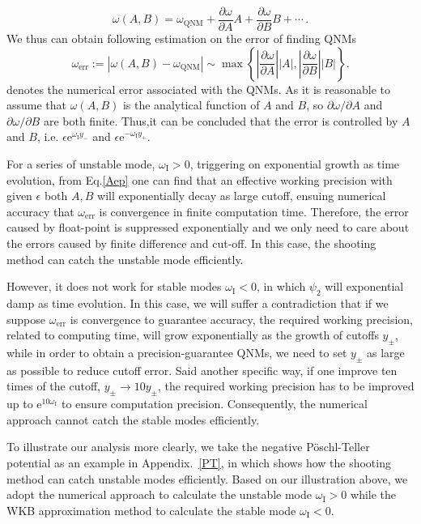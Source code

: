 \documentclass[pr, twocolumn, preprintnumbers, showpacs,footnoteadded, superscriptaddress,nofootinbib,longbibliography]{revtex4-1}
\newcommand{\te}{\mathrm{e}}
\begin{document}
%
\begin{equation}
\omega(A,B)= \omega_{\text{QNM}} +\frac{\partial\omega}{\partial A} A + \frac{\partial \omega}{\partial B} B + \cdots\,.
\end{equation}
%
We thus can obtain following estimation on the error of finding QNMs
%
\begin{equation}
\omega_{\text{err}}:=|\omega(A,B)-\omega_{\text{QNM}}|\sim\max\left\{\left|\frac{\partial \omega}{\partial A} \right|\left|A\right|,\left|\frac{\partial \omega}{\partial B}\right| \left| B\right| \right\}.
\end{equation}
%
denotes the numerical error associated with the QNMs. As it is reasonable to assume that $\omega(A,B)$ is the analytical function of $A$ and $B$, so $\partial\omega/\partial A$ and $\partial\omega/\partial B$ are both finite. Thus,it can be concluded that the error is controlled by $A$ and $B$, i.e. $\epsilon \te^{\omega_{\text{I}}y_{-}}$ and $\epsilon \te^{-\omega_{\text{I}} y_{+}}$.

For a series of  unstable mode, $\omega_{\text{I}} > 0$, triggering on exponential growth as time evolution, from Eq.\eqref{Aep} one can find that an effective working precision with given $\epsilon$ both $A, B$ will exponentially decay as large cutoff, ensuing numerical accuracy that $\omega_{\text{err}}$ is convergence in finite computation time. Therefore, the error caused by float-point is suppressed exponentially and we only need to care about the errors caused by finite difference and cut-off. In this case, the shooting method can catch the unstable mode efficiently.

However, it does not work for stable modes $\omega_{\text{I}} < 0$, in which $\psi_2$ will exponential damp as time evolution. In this case, we will suffer a contradiction that if we suppose $\omega_{\text{err}}$ is convergence to guarantee accuracy, the required working precision, related to computing time, will grow exponentially as the growth of cutoffs $y_{\pm}$, while in order to obtain a precision-guarantee QNMs, we need to set $y_{\pm}$ as large as possible to reduce cutoff error. Said another specific way, if one improve ten times of the cutoff, $y_{\pm} \to 10 y_{\pm}$, the required working precision has to be improved up to $\te^{10 \omega_{\text {I}}}$ to ensure computation precision. Consequently, the numerical approach cannot catch the stable modes efficiently.


To illustrate our analysis more clearly, we take the negative P\"{o}schl-Teller potential as an example in Appendix.~\ref{PT}, in which shows how the shooting method can catch unstable modes efficiently.  Based on our illustration above, we adopt the numerical approach to calculate the unstable mode $\omega_{\text{I}} > 0$ while the WKB approximation method to calculate the stable mode $\omega_{\text{I}} < 0$.
\end{document}
